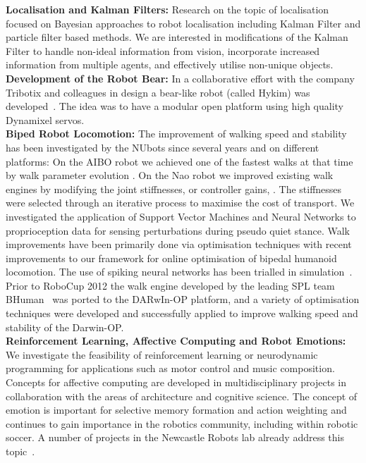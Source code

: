 \documentclass{llncs}
\begin{document}
\noindent\textbf{Localisation and Kalman Filters:} Research on the
topic of localisation focused on Bayesian approaches to robot
localisation including Kalman Filter and particle filter
based methods. We are interested in 
modifications of the Kalman Filter to handle non-ideal information
from vision, incorporate increased information from multiple agents, 
and effectively utilise non-unique objects.
\\

\noindent\textbf{Development of the Robot Bear:} In a collaborative
effort with the company Tribotix and colleagues in design a
bear-like robot (called Hykim) was developed~\cite{ChalupEtAl2006}. The idea was to have a modular open platform using high quality Dynamixel servos. 
\\

\noindent\textbf{Biped Robot Locomotion:} The improvement of walking speed and stability has been investigated by the NUbots since several years and on different platforms: On the AIBO robot we achieved one of the fastest walks at that time by walk parameter evolution \cite{QuinlanEtAlACRA2003,ChalupEtAlSMC2007}. On the Nao robot we improved existing walk engines by modifying the joint stiffnesses, or controller gains, \cite{Kulk2008,Kulk2010,Kulk2010a}. The stiffnesses were selected through an iterative process to maximise the cost of transport. We investigated the application of Support Vector Machines and Neural Networks to proprioception data for sensing perturbations during pseudo quiet stance. Walk improvements have been primarily done via optimisation techniques \cite{Kulk2011a,Kulk2011b} with recent improvements to our framework for online optimisation of bipedal humanoid locomotion. 
The use of spiking neural networks has been trialled in simulation~\cite{WiklendtChalup2008}. Prior to RoboCup 2012 the walk engine developed by the leading SPL team BHuman~\cite{BHumanWalk2010} was ported to the DARwIn-OP platform, and a variety of optimisation techniques were developed and successfully applied to improve walking speed and stability of the Darwin-OP. 
\\

\noindent\textbf{Reinforcement Learning, Affective Computing and Robot Emotions:} We investigate the feasibility of reinforcement learning or neurodynamic programming for applications such as motor control and music composition. Concepts for affective computing are developed in multidisciplinary projects in collaboration with the areas of architecture and cognitive science. The concept of emotion is important for selective memory formation and action weighting and continues to gain importance in the robotics community, including within robotic soccer. A number of projects in the Newcastle Robots lab already address this topic~\cite{ANFA2012,Pareidolia2010,HongEtAl2013a,HongEtAl2013b,WongEtAl2013}. 
\\
\end{document}
